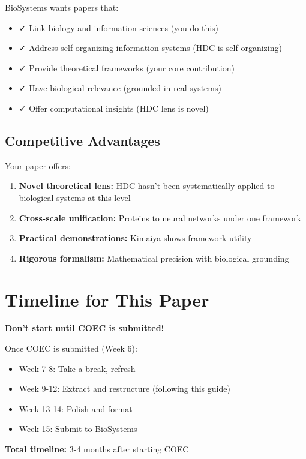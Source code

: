\documentclass[11pt]{article}
\begin{document}
BioSystems wants papers that:
\begin{itemize}
    \item ✓ Link biology and information sciences (you do this)
    \item ✓ Address self-organizing information systems (HDC is self-organizing)
    \item ✓ Provide theoretical frameworks (your core contribution)
    \item ✓ Have biological relevance (grounded in real systems)
    \item ✓ Offer computational insights (HDC lens is novel)
\end{itemize}

\subsection{Competitive Advantages}

Your paper offers:
\begin{enumerate}
    \item \textbf{Novel theoretical lens:} HDC hasn't been systematically applied to biological systems at this level
    \item \textbf{Cross-scale unification:} Proteins to neural networks under one framework
    \item \textbf{Practical demonstrations:} Kimaiya shows framework utility
    \item \textbf{Rigorous formalism:} Mathematical precision with biological grounding
\end{enumerate}

\section{Timeline for This Paper}

\textbf{Don't start until COEC is submitted!}

Once COEC is submitted (Week 6):
\begin{itemize}
    \item Week 7-8: Take a break, refresh
    \item Week 9-12: Extract and restructure (following this guide)
    \item Week 13-14: Polish and format
    \item Week 15: Submit to BioSystems
\end{itemize}

\textbf{Total timeline:} 3-4 months after starting COEC
\end{document}
